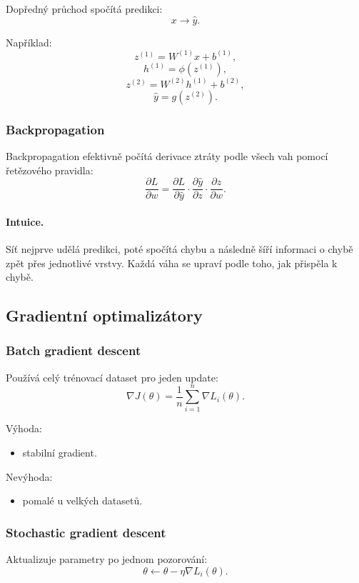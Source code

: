 Dopředný průchod spočítá predikci:
\[
x \rightarrow \hat y.
\]

Například:
\[
z^{(1)}=W^{(1)}x+b^{(1)},
\]
\[
h^{(1)}=\phi(z^{(1)}),
\]
\[
z^{(2)}=W^{(2)}h^{(1)}+b^{(2)},
\]
\[
\hat y=g(z^{(2)}).
\]

\subsubsection{Backpropagation}

Backpropagation efektivně počítá derivace ztráty podle všech vah pomocí řetězového pravidla:
\[
\frac{\partial L}{\partial w}
=
\frac{\partial L}{\partial \hat y}
\cdot
\frac{\partial \hat y}{\partial z}
\cdot
\frac{\partial z}{\partial w}.
\]

\paragraph{Intuice.}
Síť nejprve udělá predikci, poté spočítá chybu a následně šíří informaci o chybě zpět přes jednotlivé vrstvy.
Každá váha se upraví podle toho, jak přispěla k chybě.

\subsection{Gradientní optimalizátory}

\subsubsection{Batch gradient descent}

Používá celý trénovací dataset pro jeden update:
\[
\nabla J(\theta)
=
\frac{1}{n}
\sum_{i=1}^{n}
\nabla L_i(\theta).
\]

Výhoda:
\begin{itemize}
    \item stabilní gradient.
\end{itemize}

Nevýhoda:
\begin{itemize}
    \item pomalé u velkých datasetů.
\end{itemize}

\subsubsection{Stochastic gradient descent}

Aktualizuje parametry po jednom pozorování:
\[
\theta
\leftarrow
\theta
-
\eta \nabla L_i(\theta).
\]

